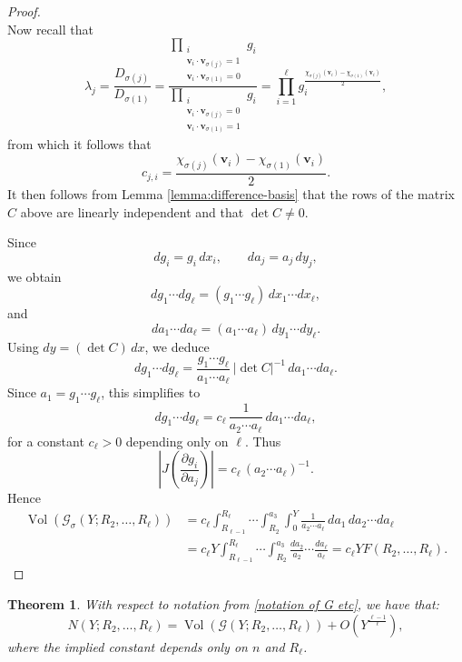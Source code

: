 \documentclass{amsart}
\newcommand{\op}[1]{\operatorname{#1}}
\theoremstyle{plain}
\newtheorem{theorem}{Theorem}[section]
\theoremstyle{definition}
\theoremstyle{remark}
\numberwithin{equation}{section}
\begin{document}
\begin{proof}
\begin{equation}
\end{equation}
Now recall that
\[\lambda_{j}=\frac{D_{\sigma(j)}}{D_{\sigma(1)}}
=
\frac{
\prod_{\substack{i\\
\mathbf v_i\cdot \mathbf v_{\sigma(j)}=1\\
\mathbf v_i\cdot \mathbf v_{\sigma(1)}=0}}
g_i}
{
\prod_{\substack{i\\
\mathbf v_i\cdot \mathbf v_{\sigma(j)}=0\\
\mathbf v_i\cdot \mathbf v_{\sigma(1)}=1}}
g_i}=\prod_{i=1}^\ell g_i^{\frac{\chi_{\sigma(j)}(\mathbf v_i)-\chi_{\sigma(1)}(\mathbf v_i)}{2}},\]
from which it follows that 
\[c_{j,i}=\frac{\chi_{\sigma(j)}(\mathbf v_i)-\chi_{\sigma(1)}(\mathbf v_i)}{2}.\]
\noindent It then follows from Lemma \ref{lemma:difference-basis} that the rows of the matrix $C$ above are linearly independent and that $\det C\neq0$. 
\par Since
\[
dg_i=g_i\,dx_i,
\qquad
da_j=a_j\,dy_j,
\]
we obtain
\[
dg_1\cdots dg_\ell
=
(g_1\cdots g_\ell)\,dx_1\cdots dx_\ell,
\]
and
\[
da_1\cdots da_\ell
=
(a_1\cdots a_\ell)\,dy_1\cdots dy_\ell.
\]
Using $dy=(\det C)\,dx$, we deduce
\[
dg_1\cdots dg_\ell
=
\frac{g_1\cdots g_\ell}{a_1\cdots a_\ell}
\,|\det C|^{-1}
\, da_1\cdots da_\ell.
\]
Since $a_1=g_1\cdots g_\ell$, this simplifies to
\[
dg_1\cdots dg_\ell
=
c_\ell\,
\frac{1}{a_2\cdots a_\ell}
\, da_1\cdots da_\ell,
\]
for a constant $c_\ell>0$ depending only on $\ell$.
Thus
\[
\left|
J\!\left(\frac{\partial g_i}{\partial a_j}\right)
\right|
=
c_\ell\, (a_2\cdots a_\ell)^{-1}.
\]
\noindent Hence
\[\begin{split}
\op{Vol}(\mathcal G_\sigma(Y;R_2, \dots, R_\ell))
&=
c_\ell
\int_{R_{\ell-1}}^{R_\ell}
\!\!\cdots
\int_{R_2}^{a_3}
\int_{0}^{Y}
\frac{1}{a_2\cdots a_\ell}
\, da_1\, da_2\cdots da_\ell\\
&=
c_\ell Y
\int_{R_{\ell-1}}^{R_\ell}
\!\!\cdots
\int_{R_2}^{a_3}
\frac{da_2}{a_2}\cdots\frac{da_\ell}{a_\ell}=c_\ell Y F(R_2,\dots,R_\ell).
\end{split}\]
\end{proof}

\begin{theorem}\label{thm:lattice-count}
With respect to notation from \eqref{notation of G etc}, we have that:
\[
N(Y;R_2,\dots,R_\ell)
=
\operatorname{Vol}\!\left(
\mathcal G(Y;R_2,\dots,R_\ell)
\right)
+
O\!\left(
Y^{\frac{\ell-1}{\ell}}
\right),
\]
where the implied constant depends only on $n$ and $R_\ell$.
\end{theorem}
\end{document}

